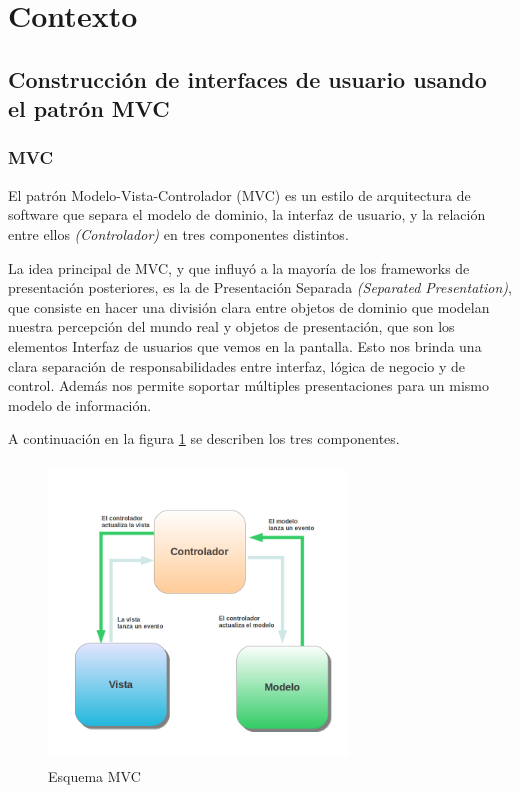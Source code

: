 \section{Contexto}
\subsection{Construcción de interfaces de usuario usando el patrón MVC}

	\subsubsection{MVC}
	El patrón Modelo-Vista-Controlador (MVC) es un estilo de arquitectura de
	software que separa el modelo de dominio, la interfaz de usuario,
	y la relación entre ellos \emph{(Controlador)} en tres componentes distintos.
	\cite{burbeck87}
	
	La idea principal de MVC, y que influyó a la mayoría de los frameworks de
	presentación posteriores, es la de Presentación Separada \emph{(Separated
	Presentation)}, que consiste en hacer una división clara entre objetos de 
	dominio que modelan nuestra percepción del mundo real y objetos de presentación, 
	que son los elementos Interfaz de usuarios que vemos en la pantalla. 
	Esto nos brinda una clara separación de responsabilidades entre interfaz,
	lógica de negocio y de control. Además nos permite soportar múltiples
	presentaciones para un mismo modelo de información. \cite{reenskaug79}
	\bigskip
	
	A continuación en la figura \ref{mvc} se describen los tres componentes.  
	
	\begin{figure}[h]
		\includegraphics[width=300px, height=300px]{img/mvc} 
		\caption{Esquema MVC}
		\label{mvc}
	\end{figure}  
	
